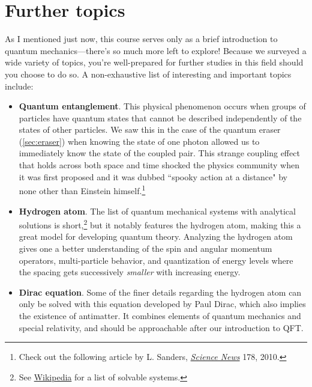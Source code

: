 \section{Further topics} \label{sec:further}

As I mentioned just now, this course serves only as a brief introduction to quantum mechanics---there's so much more left to explore! 
Because we surveyed a wide variety of topics, you're well-prepared for further studies in this field should you choose to do so. 
A non-exhaustive list of interesting and important topics include:

\begin{itemize}
	\item \textbf{Quantum entanglement}. 
	This physical phenomenon occurs when groups of particles have quantum states that cannot be described independently of the states of other particles.
	We saw this in the case of the quantum eraser (\autoref{sec:eraser}) when knowing the state of one photon allowed us to immediately know the state of the coupled pair. 
	This strange coupling effect that holds across both space and time shocked the physics community when it was first proposed and it was dubbed ``spooky action at a distance" by none other than Einstein himself.\footnote{Check out the following article by L. Sanders, \href{https://www.sciencenews.org/article/everyday-entanglement}{\emph{Science News}} 178, 2010.}
	
	\item \textbf{Hydrogen atom}. 
	The list of quantum mechanical systems with analytical solutions is short,\footnote{See \href{https://en.wikipedia.org/wiki/List_of_quantum-mechanical_systems_with_analytical_solutions}{Wikipedia} for a list of solvable systems.} but it notably features the hydrogen atom, making this a great model for developing quantum theory. 
	Analyzing the hydrogen atom gives one a better understanding of the spin and angular momentum operators, multi-particle behavior, and quantization of energy levels where the spacing gets successively \emph{smaller} with increasing energy.
	
	\item \textbf{Dirac equation}. 
	Some of the finer details regarding the hydrogen atom can only be solved with this equation developed by Paul Dirac, which also implies the existence of antimatter. 
	It combines elements of quantum mechanics and special relativity, and should be approachable after our introduction to QFT.
	

\end{itemize}
